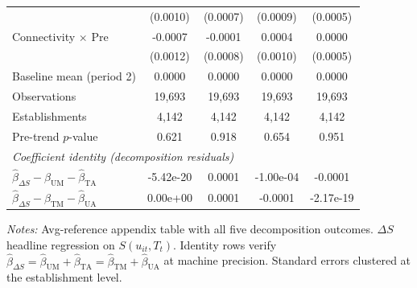 \begin{table}[H]
\begin{tabular}{lcccc}
\quad & (0.0010) & (0.0007) & (0.0009) & (0.0005) \\
\quad Connectivity $\times$ Pre  & -0.0007 & -0.0001 & 0.0004 & 0.0000 \\
\quad & (0.0012) & (0.0008) & (0.0010) & (0.0005) \\
\hline
Baseline mean (period 2) & 0.0000 & 0.0000 & 0.0000 & 0.0000 \\
Observations           & 19,693 & 19,693 & 19,693 & 19,693 \\
Establishments         & 4,142 & 4,142 & 4,142 & 4,142 \\
Pre-trend $p$-value    & 0.621 & 0.918 & 0.654 & 0.951 \\
\hline
\multicolumn{5}{l}{\textit{Coefficient identity (decomposition residuals)}} \\
\quad $\hat\beta_{\Delta S} - \hat\beta_{\text{UM}} - \hat\beta_{\text{TA}}$ & -5.42e-20 & 0.0001 & -1.00e-04 & -0.0001 \\
\quad $\hat\beta_{\Delta S} - \hat\beta_{\text{TM}} - \hat\beta_{\text{UA}}$ & 0.00e+00 & 0.0001 & -0.0001 & -2.17e-19 \\
\hline\hline
\end{tabular}
\begin{minipage}{\linewidth}
\smallskip
\scriptsize\textit{Notes:} Avg-reference appendix table with all five decomposition outcomes. $\Delta S$ headline regression on $S(u_{it}, T_t)$. Identity rows verify $\hat\beta_{\Delta S} = \hat\beta_{\text{UM}} + \hat\beta_{\text{TA}} = \hat\beta_{\text{TM}} + \hat\beta_{\text{UA}}$ at machine precision. Standard errors clustered at the establishment level.
\end{minipage}
\end{table}
